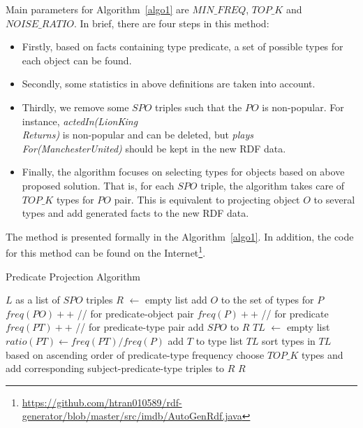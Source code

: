 \documentclass{acm_proc_article-sp}
\begin{document}
Main parameters for Algorithm~\ref{algo1} are $MIN\_FREQ$, $TOP\_K$ and $NOISE\_RATIO$. In brief, there are four steps in this method:
\begin{itemize}
\item Firstly, based on facts containing type predicate, a set of possible types for each object can be found.
\item Secondly, some statistics in above definitions are taken into account.
\item Thirdly, we remove some $SPO$ triples such that the $PO$ is non-popular. For instance, \textit{actedIn(LionKing\\Returns)} is non-popular and can be deleted, but \textit{plays\\For(ManchesterUnited)} should be kept in the new RDF data.
\item Finally, the algorithm focuses on selecting types for objects based on above proposed solution. That is, for each $SPO$ triple, the algorithm takes care of $TOP\_K$ types for $PO$ pair. This is equivalent to projecting object $O$ to several types and add generated facts to the new RDF data.
\end{itemize}

The method is presented formally in the Algorithm~\ref{algo1}. In addition, the code for this method can be found on the Internet\footnote{\url{https://github.com/htran010589/rdf-generator/blob/master/src/imdb/AutoGenRdf.java}}.

\begin{algorithm}[ht]
\caption{Predicate Projection Algorithm}
\label{algo1}
\begin{algorithmic}
\REQUIRE $L$ as a list of $SPO$ triples
\STATE $R$ $\leftarrow$ empty list
\STATE add $O$ to the set of types for $P$
\ENDIF
\STATE $freq(PO)++$  //  for predicate-object pair
\STATE $freq(P)++$  //  for predicate
\ENDFOR
\STATE
{}
\STATE $freq(PT)++$  //  for predicate-type pair
\ENDFOR
\ENDFOR
\STATE
{}
\STATE add $SPO$ to $R$
\ENDIF
\STATE
\STATE $TL$ $\leftarrow$ empty list
\STATE $ratio(PT) \leftarrow freq(PT) / freq(P)$
\STATE add $T$ to type list $TL$
\ENDIF
\ENDFOR
\STATE sort types in $TL$ based on ascending order of predicate-type frequency
\STATE choose $TOP\_K$ types and add corresponding subject-predicate-type triples to $R$
\ENDFOR
\STATE
\RETURN $R$
\end{algorithmic}
\end{algorithm}
\end{document}
